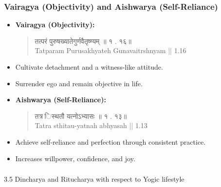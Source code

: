 \begin{frame}[fragile]\frametitle{Vairagya (Objectivity) and Aishwarya (Self-Reliance)}

      \begin{itemize}
        \item \textbf{Vairagya (Objectivity):}
        \begin{quote}
        तत्परं   पुरुषख्यातेगुर्णवैतृष्ण्यम्   ॥   १ . १६॥ \\
        Tatparam Purusakhyateh Gunavaitrshnyam || 1.16
        \end{quote}
        \item Cultivate detachment and a witness-like attitude.
        \item Surrender ego and remain objective in life.
        \item \textbf{Aishwarya (Self-Reliance):}
        \begin{quote}
        तत्र   िस्थतौ   यत्नोऽभ्यासः   ॥   १ . १३॥ \\
        Tatra sthitau-yatnah abhyasah || 1.13
        \end{quote}
        \item Achieve self-reliance and perfection through consistent practice.
        \item Increases willpower, confidence, and joy.
      \end{itemize}

\end{frame}

\begin{frame}[fragile]\frametitle{}
\begin{center}
{\Large 3.5 Dincharya and Ritucharya with respect to Yogic lifestyle}
\end{center}
\end{frame}

